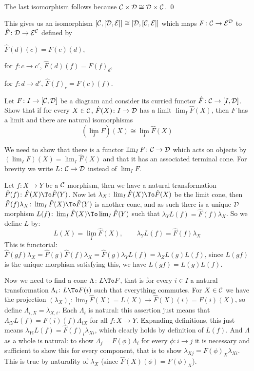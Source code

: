     The last isomorphism follows because ${{\cal C}}\times{{\cal D}}\cong{{\cal D}}\times{{\cal C}}$.
    \qed

\eproof

This gives us an isomorphism $[{{\cal C}},[{{\cal D}},{{\cal E}}]]\cong[{{\cal D}},[{{\cal C}},{{\cal E}}]]$ which maps $F\colon{{\cal C}}\to{{\cal E}}^{{\cal D}}$ to $\hat F\colon{{\cal D}}\to{{\cal E}}^{{\cal C}}$ defined by
\benum
    \item $\hat F(d)(c)=F(c)(d)$,
    \item for $f\colon c\to c'$, $\hat F(d)(f)=F(f)_d$,
    \item for $f\colon d\to d'$, $\hat F(f)_c=F(c)(f)$.
\eenum

\bthrm

    Let $F\colon I\to[{{\cal C}},{{\cal D}}]$ be a diagram and consider its curried functor $\hat F\colon{{\cal C}}\to[I,{{\cal D}}]$.
    Show that if for every $X\in{{\cal C}}$, $\hat F(X)\colon I\to{{\cal D}}$ has a limit $\lim_I\hat F(X)$, then $F$ has a limit and there are natural isomorphisms
    $$ (\lim_I F)(X) \cong \lim_I\hat F(X) $$

\ethrm

\bproof

    We need to show that there is a functor $\mathop{\rm lim}\nolimits_IF\colon{{\cal C}}\to{{\cal D}}$ which acts on objects by $(\lim_IF)(X)=\lim_I\hat F(X)$ and that it has an associated terminal cone.
    For brevity we write $L\colon{{\cal C}}\to{{\cal D}}$ instead of $\lim_IF$.

    Let $f\colon X\to Y$ be a ${{\cal C}}$-morphism, then we have a natural transformation $\hat F(f)\colon\hat F(X)\To\hat F(Y)$.
    Now let $\lambda_X\colon\lim_I\hat F(X)\To\hat F(X)$ be the limit cone, then $\hat F(f)\lambda_X\colon\lim_I\hat F(X)\To\hat F(Y)$ is another cone, and as such there is a unique
    ${{\cal D}}$-morphism $L(f)\colon\lim_I\hat F(X)\To\lim_I\hat F(Y)$ such that $\lambda_YL(f)=\hat F(f)\lambda_X$.
    So we define $L$ by:
    $$ L(X) = \lim_I\hat F(X),\qquad \lambda_YL(f)=\hat F(f)\lambda_X $$
    This is functorial: $\hat F(gf)\lambda_X=\hat F(g)\hat F(f)\lambda_X=\hat F(g)\lambda_YL(f)=\lambda_ZL(g)L(f)$, since $L(gf)$ is the unique morphism satisfying this, we have $L(gf)=L(g)L(f)$.

    Now we need to find a cone $\Lambda\colon L\To F$, that is for every $i\in I$ a natural transformation $\Lambda_i\colon L\To F(i)$ such that everything commutes.
    For $X\in{{\cal C}}$ we have the projection $(\lambda_X)_i\colon\lim_I\hat F(X)=L(X)\to\hat F(X)(i)=F(i)(X)$, so define $\Lambda_{i,X}=\lambda_{X,i}$.
    Each $\Lambda_i$ is natural: this assertion just means that $\Lambda_{iY}L(f)=F(i)(f)\Lambda_{iX}$ for all $f\colon X\to Y$.
    Expanding definitions, this just means $\lambda_{Yi}L(f)=\hat F(f)_i\lambda_{Xi}$, which clearly holds by definition of $L(f)$.
    And $\Lambda$ as a whole is natural: to show $\Lambda_j=F(\phi)\Lambda_i$ for every $\phi\colon i\to j$ it is necessary and sufficient to show this for every component, that is to show
    $\lambda_{Xj}=F(\phi)_X\lambda_{Xi}$.
    This is true by naturality of $\lambda_X$ (since $\hat F(X)(\phi)=F(\phi)_X$).

